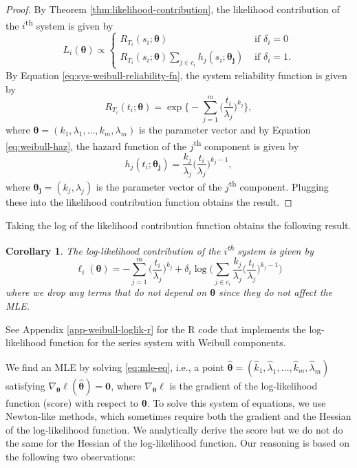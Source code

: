\documentclass[
]{article}
\theoremstyle{definition}
\theoremstyle{plain}
\newtheorem{corollary}{Corollary}[section]
\theoremstyle{definition}
\theoremstyle{definition}
\theoremstyle{definition}
\theoremstyle{definition}
\theoremstyle{remark}
\begin{document}
\begin{proof}
By Theorem \ref{thm:likelihood-contribution}, the likelihood contribution of the
\(i\)\textsuperscript{th} system is given by
\[
L_i(\boldsymbol{\theta}) \propto
\begin{cases}
    R_{T_i}(s_i;\boldsymbol{\theta})                       &\text{ if } \delta_i = 0\\
    R_{T_i}(s_i;\boldsymbol{\theta})
        \sum_{j\in c_i} h_j(s_i;\boldsymbol{\theta_j})   &\text{ if } \delta_i = 1.
\end{cases}
\]
By Equation \eqref{eq:sys-weibull-reliability-fn}, the system reliability
function is given by
\[
R_{T_i}(t_i;\boldsymbol{\theta}) = \exp\biggl\{-\sum_{j=1}^{m}\biggl(\frac{t_i}{\lambda_j}\biggr)^{k_j}\biggr\},
\]
where \(\boldsymbol{\theta }= (k_1,\lambda_1,\ldots,k_m,\lambda_m)\) is the parameter vector and by
Equation \eqref{eq:weibull-haz}, the hazard function of the \(j\)\textsuperscript{th}
component is given by
\[
h_j(t_i;\boldsymbol{\theta_j}) = \frac{k_j}{\lambda_j}\biggl(\frac{t_i}{\lambda_j}\biggr)^{k_j-1},
\]
where \(\boldsymbol{\theta_j} = (k_j,\lambda_j)\) is the parameter vector of the
\(j\)\textsuperscript{th} component. Plugging these into the likelihood contribution
function obtains the result.
\end{proof}

Taking the log of the likelihood contribution function obtains the following result.

\begin{corollary}
\protect\hypertarget{cor:cor:weibull-log-likelihood-contribution}{}\label{cor:cor:weibull-log-likelihood-contribution}The log-likelihood contribution of the \(i\)\textsuperscript{th} system is given by
\begin{equation}
\label{eq:weibull-log-likelihood-contribution}
\ell_i(\boldsymbol{\theta}) =
-\sum_{j=1}^{m}\biggl(\frac{t_i}{\lambda_j}\biggr)^{k_j} +
    \delta_i \log \!\Biggl(    
        \sum_{j \in c_i} \frac{k_j}{\lambda_j}\biggl(\frac{t_i}{\lambda_j}\biggr)^{k_j-1}
    \Biggr)
\end{equation}
where we drop any terms that do not depend on \(\boldsymbol{\theta}\) since they do not
affect the MLE.
\end{corollary}

See Appendix \ref{app-weibull-loglik-r} for the R code that implements the log-likelihood function
for the series system with Weibull components.

We find an MLE by solving \eqref{eq:mle-eq}, i.e., a point
\(\boldsymbol{\hat\theta} = (\hat{k}_1,\hat{\lambda}_1,\ldots,\hat{k}_m,\hat{\lambda}_m)\)
satisfying \(\nabla_{\boldsymbol{\theta}} \ell(\boldsymbol{\hat{\boldsymbol{\theta}}}) = \boldsymbol{0}\), where
\(\nabla_{\boldsymbol{\theta}} \ell\) is the gradient of the log-likelihood function (score) with
respect to \(\boldsymbol{\theta}\). To solve this system of equations, we use Newton-like
methods, which sometimes require both the gradient and the Hessian of the
log-likelihood function. We analytically derive the score but we do not do the
same for the Hessian of the log-likelihood function. Our reasoning is based on
the following two observations:
\end{document}
